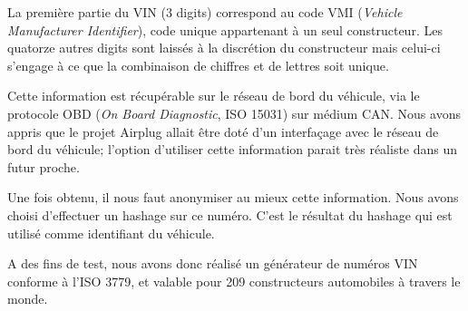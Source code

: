 La première partie du VIN (3 digits) correspond au code VMI (\textit{Vehicle Manufacturer Identifier}), code unique appartenant à un seul constructeur.
Les quatorze autres digits sont laissés à la discrétion du constructeur mais celui-ci s'engage à ce que la combinaison de chiffres et de lettres soit unique.

Cette information est récupérable sur le réseau de bord du véhicule, via le protocole OBD (\textit{On Board Diagnostic}, ISO 15031) sur médium CAN. Nous avons appris que le projet Airplug allait être doté d'un interfaçage avec le réseau de bord du véhicule; l'option d'utiliser cette information parait très réaliste dans un futur proche.

Une fois obtenu, il nous faut anonymiser au mieux cette information. Nous avons choisi d'effectuer un hashage sur ce numéro. C'est le résultat du hashage qui est utilisé comme identifiant du véhicule.

A des fins de test, nous avons donc réalisé un générateur de numéros VIN conforme à l'ISO 3779, et valable pour 209 constructeurs automobiles à travers le monde.
